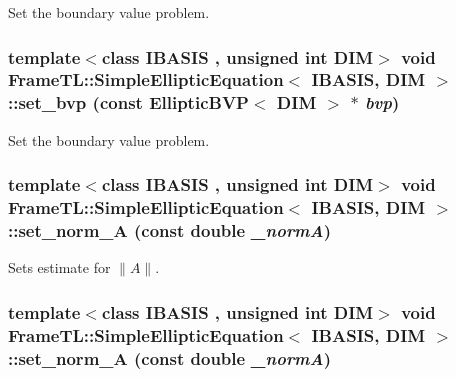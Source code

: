 Set the boundary value problem. \hypertarget{classFrameTL_1_1SimpleEllipticEquation_56298192b4c795a3e2923d3c9175116e}{
\subsubsection[{set\_\-bvp}]{\setlength{\rightskip}{0pt plus 5cm}template$<$class IBASIS , unsigned int DIM$>$ void {\bf FrameTL::SimpleEllipticEquation}$<$ IBASIS, DIM $>$::set\_\-bvp (const EllipticBVP$<$ DIM $>$ $\ast$ {\em bvp})}}
\label{classFrameTL_1_1SimpleEllipticEquation_56298192b4c795a3e2923d3c9175116e}


Set the boundary value problem. \hypertarget{classFrameTL_1_1SimpleEllipticEquation_2c56b637a942bd4543e7cbf6cd885244}{
\subsubsection[{set\_\-norm\_\-A}]{\setlength{\rightskip}{0pt plus 5cm}template$<$class IBASIS , unsigned int DIM$>$ void {\bf FrameTL::SimpleEllipticEquation}$<$ IBASIS, DIM $>$::set\_\-norm\_\-A (const double {\em \_\-normA})}}
\label{classFrameTL_1_1SimpleEllipticEquation_2c56b637a942bd4543e7cbf6cd885244}


Sets estimate for $\|A\|$. \hypertarget{classFrameTL_1_1SimpleEllipticEquation_2c56b637a942bd4543e7cbf6cd885244}{
\subsubsection[{set\_\-norm\_\-A}]{\setlength{\rightskip}{0pt plus 5cm}template$<$class IBASIS , unsigned int DIM$>$ void {\bf FrameTL::SimpleEllipticEquation}$<$ IBASIS, DIM $>$::set\_\-norm\_\-A (const double {\em \_\-normA})}}
\label{classFrameTL_1_1SimpleEllipticEquation_2c56b637a942bd4543e7cbf6cd885244}


